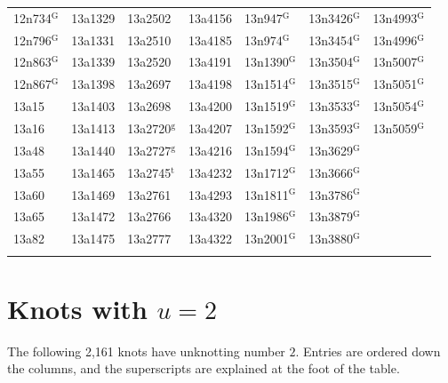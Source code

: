 \documentclass[12pt, oneside]{amsart}
\newcommand{\nUtwo}{2{,}161}
\begin{document}
{\begin{longtable}{*{7}{>{\raggedright\arraybackslash}p{}}}
12n734$^{\mathrm{G}}$ & 13a1329 & 13a2502 & 13a4156 & 13n947$^{\mathrm{G}}$ & 13n3426$^{\mathrm{G}}$ & 13n4993$^{\mathrm{G}}$ \\
12n796$^{\mathrm{G}}$ & 13a1331 & 13a2510 & 13a4185 & 13n974$^{\mathrm{G}}$ & 13n3454$^{\mathrm{G}}$ & 13n4996$^{\mathrm{G}}$ \\
12n863$^{\mathrm{G}}$ & 13a1339 & 13a2520 & 13a4191 & 13n1390$^{\mathrm{G}}$ & 13n3504$^{\mathrm{G}}$ & 13n5007$^{\mathrm{G}}$ \\
12n867$^{\mathrm{G}}$ & 13a1398 & 13a2697 & 13a4198 & 13n1514$^{\mathrm{G}}$ & 13n3515$^{\mathrm{G}}$ & 13n5051$^{\mathrm{G}}$ \\
13a15 & 13a1403 & 13a2698 & 13a4200 & 13n1519$^{\mathrm{G}}$ & 13n3533$^{\mathrm{G}}$ & 13n5054$^{\mathrm{G}}$ \\
13a16 & 13a1413 & 13a2720$^{\mathrm{g}}$ & 13a4207 & 13n1592$^{\mathrm{G}}$ & 13n3593$^{\mathrm{G}}$ & 13n5059$^{\mathrm{G}}$ \\
13a48 & 13a1440 & 13a2727$^{\mathrm{g}}$ & 13a4216 & 13n1594$^{\mathrm{G}}$ & 13n3629$^{\mathrm{G}}$ &  \\
13a55 & 13a1465 & 13a2745$^{\mathrm{t}}$ & 13a4232 & 13n1712$^{\mathrm{G}}$ & 13n3666$^{\mathrm{G}}$ &  \\
13a60 & 13a1469 & 13a2761 & 13a4293 & 13n1811$^{\mathrm{G}}$ & 13n3786$^{\mathrm{G}}$ &  \\*
13a65 & 13a1472 & 13a2766 & 13a4320 & 13n1986$^{\mathrm{G}}$ & 13n3879$^{\mathrm{G}}$ &  \\*
13a82 & 13a1475 & 13a2777 & 13a4322 & 13n2001$^{\mathrm{G}}$ & 13n3880$^{\mathrm{G}}$ &  \\*
\multicolumn{7}{@{}l@{}}{\usebox{\appendixLegendBox}} \\
\end{longtable}}

\section{Knots with \texorpdfstring{$u=2$}{u=2}}\label{app:u2}
The following \nUtwo{} knots have unknotting number $2$.  Entries are ordered down the
columns, and the superscripts are explained at the foot of the table.
\end{document}
